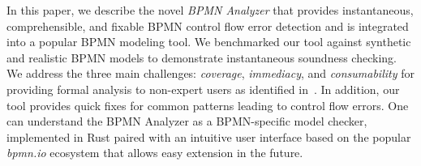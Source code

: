 \documentclass[
twocolumn
]{ceurart}
\begin{document}
In this paper, we describe the novel \textit{BPMN Analyzer} that provides instantaneous, comprehensible, and fixable BPMN control flow error detection and is integrated into a popular BPMN modeling tool.
We benchmarked our tool against synthetic and realistic BPMN models to demonstrate instantaneous soundness checking.
We address the three main challenges: \textit{coverage}, \textit{immediacy}, and \textit{consumability} for providing formal analysis to non-expert users as identified in~\cite{fahlandAnalysisDemandInstantaneous2011}.
In addition, our tool provides quick fixes for common patterns leading to control flow errors.
One can understand the BPMN Analyzer as a BPMN-specific model checker, implemented in Rust paired with an intuitive user interface based on the popular \textit{bpmn.io} ecosystem that allows easy extension in the future.



\end{document}
